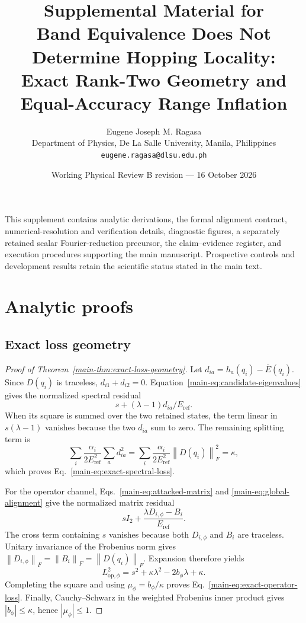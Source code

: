 \documentclass[11pt]{article}
\newcommand{\norm}[1]{\left\lVert #1\right\rVert}
\begin{document}
\title{Supplemental Material for\\
Band Equivalence Does Not Determine Hopping Locality:\\
Exact Rank-Two Geometry and Equal-Accuracy Range Inflation}
\author{Eugene Joseph M. Ragasa\\
Department of Physics, De La Salle University, Manila, Philippines\\
\texttt{eugene.ragasa@dlsu.edu.ph}}
\date{Working Physical Review B revision --- 16 October 2026}
\maketitle

\noindent This supplement contains analytic derivations, the formal alignment contract,
numerical-resolution and verification details, diagnostic figures, a separately retained
scalar Fourier-reduction precursor, the claim--evidence register, and execution procedures
supporting the main manuscript. Prospective controls
and development results retain the scientific status stated in the main text.

\tableofcontents
\clearpage
\section{Analytic proofs}
\subsection{Exact loss geometry}
\begin{proof}[Proof of Theorem~\ref{main-thm:exact-loss-geometry}]
Let $d_{ia}=h_a(q_i)-\bar E(q_i)$. Since $D(q_i)$ is traceless,
$d_{i1}+d_{i2}=0$. Equation~\eqref{main-eq:candidate-eigenvalues} gives the normalized
spectral residual
\[
 s+(\lambda-1)d_{ia}/E_{\mathrm{ref}}.
\]
When its square is summed over the two retained states, the term linear in $s(\lambda-1)$
vanishes because the two $d_{ia}$ sum to zero. The remaining splitting term is
\[
 \sum_i\frac{\alpha_i}{2E_{\mathrm{ref}}^2}\sum_a d_{ia}^2
 =\sum_i\frac{\alpha_i}{2E_{\mathrm{ref}}^2}\norm{D(q_i)}_F^2
 =\kappa,
\]
which proves Eq.~\eqref{main-eq:exact-spectral-loss}.

For the operator channel, Eqs.~\eqref{main-eq:attacked-matrix} and
\eqref{main-eq:global-alignment} give the normalized matrix residual
\[
 sI_2+\frac{\lambda D_{i,\phi}-B_i}{E_{\mathrm{ref}}}.
\]
The cross term containing $s$ vanishes because both $D_{i,\phi}$ and $B_i$ are
traceless. Unitary invariance of the Frobenius norm gives
$\norm{D_{i,\phi}}_F=\norm{B_i}_F=\norm{D(q_i)}_F$. Expansion therefore yields
\[
 L_{\mathrm{op},\phi}^2
 =s^2+\kappa\lambda^2-2b_\phi\lambda+\kappa.
\]
Completing the square and using $\mu_\phi=b_\phi/\kappa$ proves
Eq.~\eqref{main-eq:exact-operator-loss}. Finally, Cauchy--Schwarz in the weighted Frobenius
inner product gives $|b_\phi|\le\kappa$, hence $|\mu_\phi|\le1$.
\end{proof}
\end{document}
